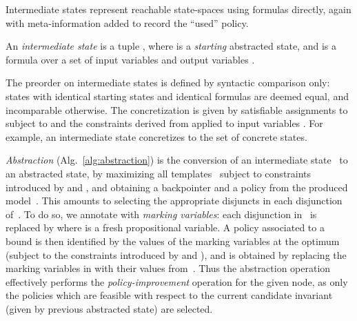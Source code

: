 \documentclass{llncs}
\begin{document}
Intermediate states represent reachable state-spaces using formulas directly,
again with meta-information added to record the ``used'' policy.

\begin{definition}
    An \emph{intermediate state} is a tuple , where  is
    a \emph{starting} abstracted state, and 
    is a formula over a set of input variables 
    and output variables .
    \label{def:intermediate_state}
\end{definition}

The preorder on intermediate states is defined by syntactic comparison only:
states with identical starting states and identical formulas are deemed equal,
and incomparable otherwise.
The concretization is given by satisfiable assignments to 
subject to 
and the constraints derived from  applied to input variables .
For example, an intermediate state 
concretizes to the set  of concrete states.

\emph{Abstraction} (Alg.~\ref{alg:abstraction})
is the conversion of an intermediate state~ to
an abstracted state, by maximizing all templates~
subject to constraints introduced by  and ,
and obtaining a backpointer and a policy from the produced model~.
This amounts to selecting the appropriate disjuncts in each disjunction of~.
To do so, we annotate  with \emph{marking variables}:
each disjunction  in~ is replaced by  where  is a fresh propositional variable.
A policy associated to a bound is then identified by the
values of the marking variables at the optimum (subject to the constraints
introduced by  and ),
and is obtained by replacing the marking variables in  with their values
from~.
Thus the abstraction operation effectively performs the \emph{policy-improvement}
operation for the given node, as only the policies which are
feasible with respect to the current candidate invariant (given by previous
abstracted state) are selected.
\end{document}
